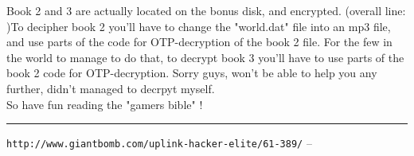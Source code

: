 \documentclass[11pt,twoside,a4paper]{book}
\begin{document}
{Book 2 and 3 are actually located on the bonus disk, and encrypted. (overall line: )To decipher book 2 you'll have to change the "world.dat" file into an mp3 file, and use parts of the code for OTP-decryption of the book 2 file. For the few in the world to manage to do that, to decrypt book 3 you'll have to use parts of the book 2 code for OTP-decryption. Sorry guys, won't be able to help you any further, didn't managed to decrpyt myself. ~\\

So have fun reading the "gamers bible" ! %


\begin{center} \rule{0.85\textwidth}{0.01cm} \end{center}

\texttt{http://www.giantbomb.com/uplink-hacker-elite/61-389/} -- ~\\ 

}
\end{document}
